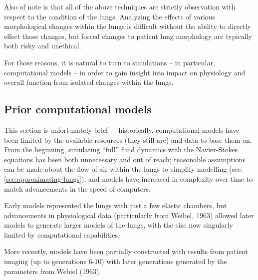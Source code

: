 
Also of note is that all of the above techniques are strictly observation with respect to the
condition of the lungs. Analyzing the effects of various morphological changes within the lungs is
difficult without the ability to directly effect those changes, but forced changes to patient lung
morphology are typically both risky and unethical.

For those reasons, it is natural to turn to simulations -- in particular, computational models -- in
order to gain insight into impact on physiology and overall function from isolated changes within
the lungs.

\subsection{Prior computational models}

This section is unfortunately brief~--~historically, computational models have been limited by the
available resources (they still are) and data to base them on. From the beginning, simulating
``full'' fluid dynamics with the Navier-Stokes equations has been both unnecessary and out of reach;
reasonable assumptions can be made about the flow of air within the lungs to simplify modelling
(see: \autoref{sec:approximating-lungs}), and models have increased in complexity over time to match
advancements in the speed of computers.

Early models represented the lungs with just a few elastic chambers, but advancements in
physiological data (particularly from Weibel, 1963) allowed later models to generate larger models
of the lungs, with the size now singularly limited by computational capabilities.

More recently, models have been partially constructed with results from patient imaging (up to
generations 6-10) with later generations generated by the parameters from Webiel (1963).

